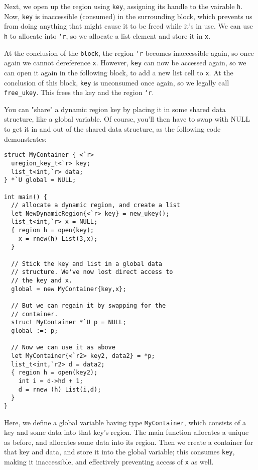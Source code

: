 Next, we open up the region using \texttt{key}, assigning its handle to the
vairable \texttt{h}.  Now, \texttt{key} is inaccessible (consumed) in the
surrounding block, which prevents us from doing anything that might cause it
to be freed while it's in use.  We can use \texttt{h} to allocate into
\texttt{`r}, so we allocate a list element and store it in \texttt{x}.

At the conclusion of the \texttt{block}, the region \texttt{`r} becomes
inaccessible again, so once again we cannot dereference \texttt{x}.
However, \texttt{key} can now be accessed again, so we can open it again in
the following block, to add a new list cell to \texttt{x}.  At the
conclusion of this block, \texttt{key} is unconsumed once again, so we
legally call \texttt{free\_ukey}.  This frees the key and the region
\texttt{`r}.

You can "share" a dynamic region key by placing it in some shared data
structure, like a global variable.  Of course, you'll then have to swap with
NULL to get it in and out of the shared data structure, as the following
code demonstrates:
\begin{verbatim}
struct MyContainer { <`r>
  uregion_key_t<`r> key;
  list_t<int,`r> data;
} *`U global = NULL;

int main() {
  // allocate a dynamic region, and create a list
  let NewDynamicRegion{<`r> key} = new_ukey();
  list_t<int,`r> x = NULL;
  { region h = open(key);
    x = rnew(h) List(3,x);
  }

  // Stick the key and list in a global data
  // structure. We've now lost direct access to
  // the key and x.
  global = new MyContainer{key,x};

  // But we can regain it by swapping for the
  // container.
  struct MyContainer *`U p = NULL;
  global :=: p;

  // Now we can use it as above
  let MyContainer{<`r2> key2, data2} = *p;
  list_t<int,`r2> d = data2;
  { region h = open(key2);
    int i = d->hd + 1;
    d = rnew (h) List(i,d);
  }
}
\end{verbatim}
Here, we define a global variable having type \texttt{MyContainer}, which
consists of a key and some data into that key's region.  The main function
allocates a unique as before, and allocates some data into its region.  Then
we create a container for that key and data, and store it into the global
variable; this consumes \texttt{key}, making it inaccessible, and
effectively preventing access of \texttt{x} as well.


